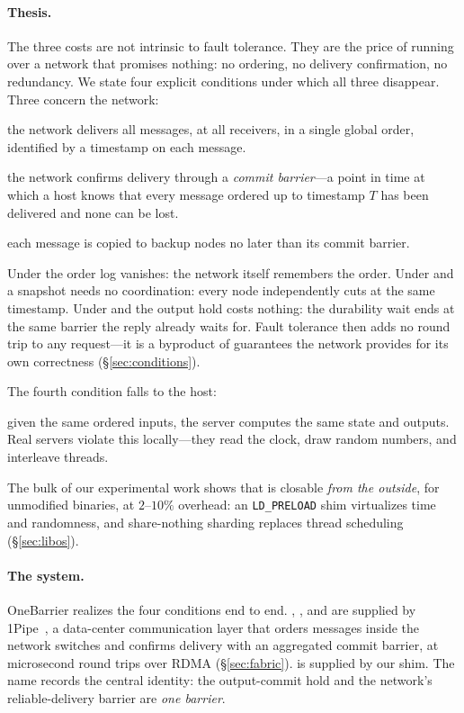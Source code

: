 \paragraph{Thesis.} The three costs are not intrinsic to fault tolerance.
They are the price of running over a network that promises nothing: no
ordering, no delivery confirmation, no redundancy. We state four explicit
conditions under which all three disappear. Three concern the network:
\begin{description}[leftmargin=1.4em,itemsep=1pt,topsep=2pt,font=\normalfont]
\item[\Order:] the network delivers all messages, at all
  receivers, in a single global order, identified by a timestamp on each
  message.
\item[\Barrier:] the network confirms
  delivery through a \emph{commit barrier}---a point in time at which a host
  knows that every message ordered up to timestamp $T$ has been delivered
  and none can be lost.
\item[\Durability:] each message is
  copied to backup nodes no later than its commit barrier.
\end{description}
Under \Order the order log vanishes: the network itself remembers the
order. Under \Order and \Barrier a snapshot needs no coordination: every
node independently cuts at the same timestamp. Under \Barrier and
\Durability the output hold costs nothing: the durability wait ends at the
same barrier the reply already waits for. Fault tolerance then adds no
round trip to any request---it is a byproduct of guarantees the network
provides for its own correctness (\S\ref{sec:conditions}).

The fourth condition falls to the host:
\begin{description}[leftmargin=1.4em,itemsep=1pt,topsep=2pt,font=\normalfont]
\item[\Determinism:] given the same ordered inputs,
  the server computes the same state and outputs. Real servers violate this
  locally---they read the clock, draw random numbers, and interleave
  threads.
\end{description}
The bulk of our experimental work shows that \Determinism is closable
\emph{from the outside}, for unmodified binaries, at $2$--$10\%$
overhead: an \texttt{LD\_PRELOAD} shim virtualizes time and randomness,
and share-nothing sharding replaces thread scheduling
(\S\ref{sec:libos}).

\paragraph{The system.} OneBarrier realizes the four conditions end to
end. \Order, \Barrier, and \Durability are supplied by
1Pipe~\citep{li2021onepipe}, a data-center communication layer that orders
messages inside the network switches and confirms delivery with an
aggregated commit barrier, at microsecond round trips over RDMA
(\S\ref{sec:fabric}). \Determinism
is supplied by our shim. The name records the central identity: the
output-commit hold and the network's reliable-delivery barrier are
\emph{one barrier}.

